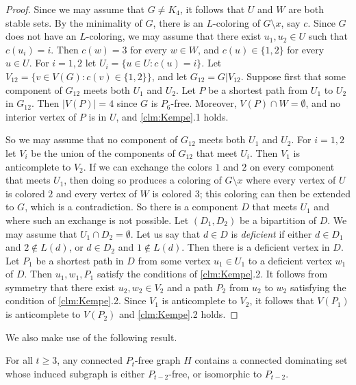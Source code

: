 \documentclass[11pt]{article}
\begin{document}
\begin{proof}
Since we may assume that $G \neq K_4$, it follows that $U$ and $W$ are both stable sets. 
By the minimality of $G$, there is an $L$-coloring of $G \setminus x$, say $c$.
Since $G$ does not have an $L$-coloring, we may assume that there exist $u_1,u_2 \in U$ such that $c(u_i)=i$. 
Then $c(w)=3$ for every $w \in W$, and $c(u) \in \{1,2\}$ for every $u \in U$. 
For $i=1,2$ let $U_i=\{u \in U : c(u)=i\}$. 
Let $V_{12}=\{v \in V(G) : c(v) \in \{1,2\}\}$, and let $G_{12}=G|V_{12}$. 
Suppose first that some component of $G_{12}$ meets both $U_1$ and $U_2$.
Let $P$ be a shortest path from $U_1$ to $U_2$ in $G_{12}$. 
Then $|V(P)|=4$ since $G$ is $P_6$-free.
Moreover, $V(P) \cap W = \emptyset$, and no interior vertex of $P$ is in $U$,
and \ref{clm:Kempe}.1 holds.

So we may assume that no component of $G_{12}$ meets both $U_1$ and $U_2$.
For $i=1,2$ let  $V_i$ be the union of the components of $G_{12}$ that meet $U_i$.
Then $V_1$ is anticomplete to $V_2$.
If we can exchange the colors $1$ and $2$ on every component that meets
$U_1$, then doing so produces a coloring of $G \setminus x$ where every vertex 
of $U$ is colored $2$ and every vertex of $W$ is colored $3$; 
this coloring can then be extended to $G$, which is a contradiction. 
So there is a component $D$ that meets $U_1$ and where such an exchange is 
not possible. Let $(D_1,D_2)$ be a bipartition of $D$.
We may assume that $U_1 \cap D_2 = \emptyset$. Let us say that $d \in D$
is {\em deficient} if either $d \in D_1$ and $2 \not \in L(d)$, or
$d \in D_2$ and $1 \not \in L(d)$. Then there is a deficient vertex in $D$.
Let $P_1$ be a shortest path in $D$ from some vertex $u_1 \in U_1$ to a 
deficient vertex $w_1$ of $D$. Then $u_1,w_1,P_1$ satisfy the conditions of
\ref{clm:Kempe}.2.   It follows from symmetry that there exist 
$u_2, w_2 \in V_2$ and a path $P_2$ from $u_2$ to $w_2$ satisfying the
condition of \ref{clm:Kempe}.2. Since $V_1$ is anticomplete to $V_2$,
it follows that $V(P_1)$ is anticomplete to $V(P_2)$ and \ref{clm:Kempe}.2 
holds.  \end{proof}

We also make use of the following result.		

\begin{theorem}\label{structure}
For all $ t \geq 3 $, any connected $ P_t $-free graph $ H $ contains a connected dominating set whose induced subgraph is either $P_{t-2}$-free, or isomorphic to $P_{t-2}$.
\end{theorem}
\end{document}
